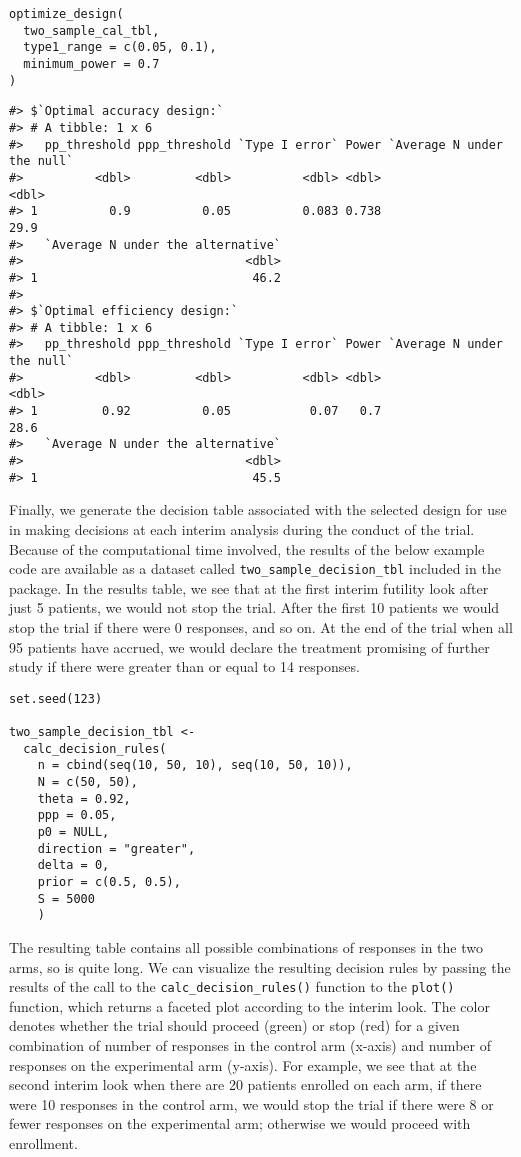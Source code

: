 \begin{verbatim}
optimize_design(
  two_sample_cal_tbl, 
  type1_range = c(0.05, 0.1), 
  minimum_power = 0.7
)
\end{verbatim}

\begin{verbatim}
#> $`Optimal accuracy design:`
#> # A tibble: 1 x 6
#>   pp_threshold ppp_threshold `Type I error` Power `Average N under the null`
#>          <dbl>         <dbl>          <dbl> <dbl>                      <dbl>
#> 1          0.9          0.05          0.083 0.738                       29.9
#>   `Average N under the alternative`
#>                               <dbl>
#> 1                              46.2
#> 
#> $`Optimal efficiency design:`
#> # A tibble: 1 x 6
#>   pp_threshold ppp_threshold `Type I error` Power `Average N under the null`
#>          <dbl>         <dbl>          <dbl> <dbl>                      <dbl>
#> 1         0.92          0.05           0.07   0.7                       28.6
#>   `Average N under the alternative`
#>                               <dbl>
#> 1                              45.5
\end{verbatim}

Finally, we generate the decision table associated with the selected design for use in making decisions at each interim analysis during the conduct of the trial. Because of the computational time involved, the results of the below example code are available as a dataset called \texttt{two\_sample\_decision\_tbl} included in the  package. In the results table, we see that at the first interim futility look after just 5 patients, we would not stop the trial. After the first 10 patients we would stop the trial if there were 0 responses, and so on. At the end of the trial when all 95 patients have accrued, we would declare the treatment promising of further study if there were greater than or equal to 14 responses.

\begin{verbatim}
set.seed(123)

two_sample_decision_tbl <- 
  calc_decision_rules(
    n = cbind(seq(10, 50, 10), seq(10, 50, 10)),
    N = c(50, 50),
    theta = 0.92, 
    ppp = 0.05, 
    p0 = NULL, 
    direction = "greater", 
    delta = 0, 
    prior = c(0.5, 0.5), 
    S = 5000
    )
\end{verbatim}

The resulting table contains all possible combinations of responses in the two arms, so is quite long. We can visualize the resulting decision rules by passing the results of the call to the \texttt{calc\_decision\_rules()} function to the \texttt{plot()} function, which returns a faceted plot according to the interim look. The color denotes whether the trial should proceed (green) or stop (red) for a given combination of number of responses in the control arm (x-axis) and number of responses on the experimental arm (y-axis). For example, we see that at the second interim look when there are 20 patients enrolled on each arm, if there were 10 responses in the control arm, we would stop the trial if there were 8 or fewer responses on the experimental arm; otherwise we would proceed with enrollment.

